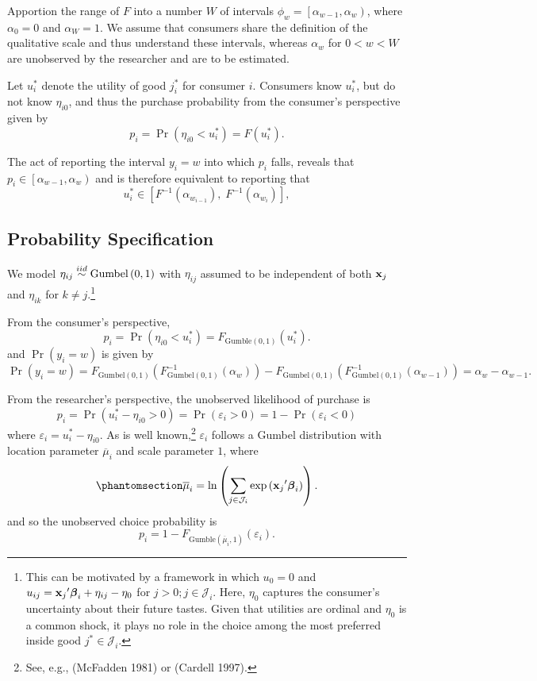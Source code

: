 \documentclass[
  letterpaper,
  DIV=11,
  numbers=noendperiod]{scrartcl}
\begin{document}
Apportion the range of \(F\) into a number \(W\) of intervals
\(\phi_w = \left[ \alpha_{w-1}, \alpha_w \right)\), where
\(\alpha_0 = 0\) and \(\alpha_W = 1\). We assume that consumers share
the definition of the qualitative scale and thus understand these
intervals, whereas \(\alpha_w\) for \(0<w<W\) are unobserved by the
researcher and are to be estimated.

Let \(u_i^*\) denote the utility of good \(j^*_i\) for consumer \(i\).
Consumers know \(u_i^*\), but do not know \(\eta_{i0}\), and thus the
purchase probability from the consumer's perspective given by \[
p_i = \Pr \left( \eta_{i0} < u_i^* \right) = F\left( u_i^* \right).
\]

The act of reporting the interval \(y_i=w\) into which \(p_i\) falls,
reveals that \(p_i \in \left[\alpha_{w-1},\alpha_w\right)\) and is
therefore equivalent to reporting that \[
u_i^* \in \left[
    F^{-1} \left( \alpha_{w_{i-1}} \right), \;
    F^{-1} \left( \alpha_{w_i}     \right)
\right],
\]

\subsection{Probability Specification}\label{probability-specification}

We model \(\eta_{ij} \stackrel{iid}{\sim} \text{Gumbel} \left( 0,1 \right)\) with
\(\eta_{ij}\) assumed to be independent of both \(\mathbf{x}_j\) and
\(\eta_{ik}\) for \(k \ne j\).\footnote{This can be motivated by a
  framework in which \(u_0 = 0\) and
  \(u_{ij} = {\mathbf{x}_j}'\boldsymbol{\beta}_i + \eta_{ij} - \eta_0\) for
  \(j>0; j \in \mathcal{J}_i\). Here, \(\eta_0\) captures the consumer's
  uncertainty about their future tastes. Given that utilities are
  ordinal and \(\eta_0\) is a common shock, it plays no role in the
  choice among the most preferred inside good \(j^* \in \mathcal{J}_i\).}

From the consumer's perspective, \[
p_i = \Pr \left( \eta_{i0} < u_i^* \right) = F_{\text{Gumble}\left(0,1\right)} \left( u_i^* \right).
\] and \(\Pr(y_i=w)\) is given by \[
\Pr(y_i=w)
= 
F_{\text{Gumbel}\left(0,1\right)} \left( F^{-1}_{\text{Gumbel}\left(0,1\right)} \left( \alpha_w \right) \right) - 
F_{\text{Gumbel}\left(0,1\right)} \left( F^{-1}_{\text{Gumbel}\left(0,1\right)} \left( \alpha_{w-1} \right) \right)
=
\alpha_w - \alpha_{w-1}.
\]

From the researcher's perspective, the unobserved likelihood of purchase
is \[
p_i = \Pr \left(  u_i^* - \eta_{i0} > 0 \right) = \Pr \left( \varepsilon_i > 0 \right) = 1 - \Pr \left( \varepsilon_i < 0 \right)
\] where \(\varepsilon_i = u_i^* - \eta_{i0}\). As is well
known,\footnote{See, e.g., (McFadden 1981) or (Cardell 1997).}
\(\varepsilon_i\) follows a Gumbel distribution with location parameter
\(\overline{\mu}_i\) and scale parameter \(1\), where
\begin{equation}\phantomsection\label{eq-max-mu}{
\overline{\mu}_i = \ln \left( \sum_{j\in\mathcal{J}_i} \exp \left( {\x_j}'\bfbeta_i \right) \right).
}\end{equation} and so the unobserved choice probability is \[
p_i = 1 - F_{\text{Gumble} \left( \overline{\mu}_i, 1 \right)} \left( \varepsilon_i \right).
\]
\end{document}
